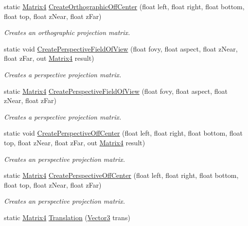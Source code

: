 \begin{DoxyCompactItemize}
static \hyperlink{struct_open_t_k_1_1_matrix4}{Matrix4} \hyperlink{struct_open_t_k_1_1_matrix4_a54e0e0e066f022cb2274d644778bc306}{Create\-Orthographic\-Off\-Center} (float left, float right, float bottom, float top, float z\-Near, float z\-Far)
\begin{DoxyCompactList}\small\item\em Creates an orthographic projection matrix. \end{DoxyCompactList}\item 
static void \hyperlink{struct_open_t_k_1_1_matrix4_a8a2e29e1e9c51fd05b1a629d439b8fd9}{Create\-Perspective\-Field\-Of\-View} (float fovy, float aspect, float z\-Near, float z\-Far, out \hyperlink{struct_open_t_k_1_1_matrix4}{Matrix4} result)
\begin{DoxyCompactList}\small\item\em Creates a perspective projection matrix. \end{DoxyCompactList}\item 
static \hyperlink{struct_open_t_k_1_1_matrix4}{Matrix4} \hyperlink{struct_open_t_k_1_1_matrix4_ae5e37b458cc2c39d9c0effa6acb1f387}{Create\-Perspective\-Field\-Of\-View} (float fovy, float aspect, float z\-Near, float z\-Far)
\begin{DoxyCompactList}\small\item\em Creates a perspective projection matrix. \end{DoxyCompactList}\item 
static void \hyperlink{struct_open_t_k_1_1_matrix4_ae2705c0073d0d6c74d7103976c682749}{Create\-Perspective\-Off\-Center} (float left, float right, float bottom, float top, float z\-Near, float z\-Far, out \hyperlink{struct_open_t_k_1_1_matrix4}{Matrix4} result)
\begin{DoxyCompactList}\small\item\em Creates an perspective projection matrix. \end{DoxyCompactList}\item 
static \hyperlink{struct_open_t_k_1_1_matrix4}{Matrix4} \hyperlink{struct_open_t_k_1_1_matrix4_a54cf77e18237ee646991451f043caf0b}{Create\-Perspective\-Off\-Center} (float left, float right, float bottom, float top, float z\-Near, float z\-Far)
\begin{DoxyCompactList}\small\item\em Creates an perspective projection matrix. \end{DoxyCompactList}\item 
static \hyperlink{struct_open_t_k_1_1_matrix4}{Matrix4} \hyperlink{struct_open_t_k_1_1_matrix4_a92deb0e3f5a109937f1214bcd292b3d8}{Translation} (\hyperlink{struct_open_t_k_1_1_vector3}{Vector3} trans)

\end{DoxyCompactItemize}
